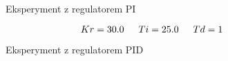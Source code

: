 \ifdefined\CompileFigures
\begin{figure}[H] 
    \centering
    
    \caption{Eksperyment z regulatorem PI}
    \label{lab:zad3:figure:regulatorPI}
 \end{figure}
 \fi

 $$Kr = \num{30.0} \indent Ti = \num{25.0} \indent Td = \num{1}$$

\ifdefined\CompileFigures
\begin{figure}[H] 
    \centering
    
    \caption{Eksperyment z regulatorem PID}
    \label{lab:zad3:figure:regulatorPID}
 \end{figure}
 \fi

\newpage
